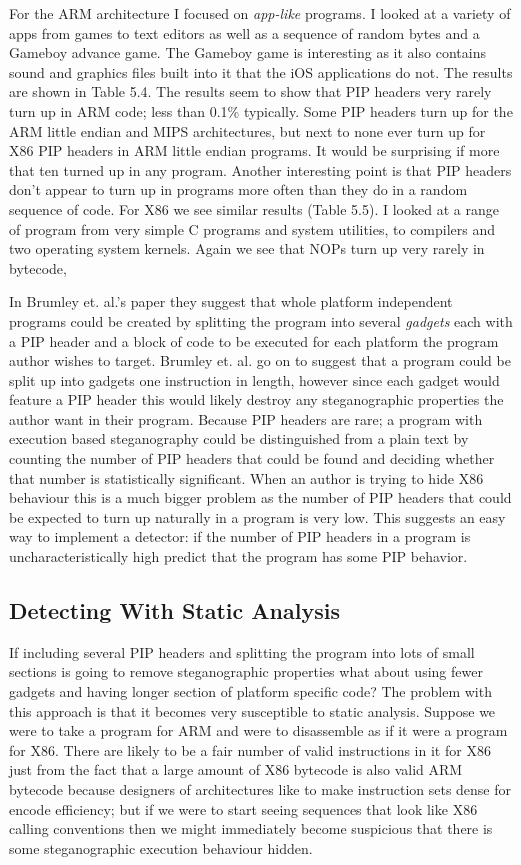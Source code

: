 \documentclass[10pt,]{book}
\begin{document}
For the ARM architecture I focused on \emph{app-like} programs. I looked
at a variety of apps from games to text editors as well as a sequence of
random bytes and a Gameboy advance game. The Gameboy game is interesting
as it also contains sound and graphics files built into it that the iOS
applications do not. The results are shown in Table 5.4. The results
seem to show that PIP headers very rarely turn up in ARM code; less than
0.1\% typically. Some PIP headers turn up for the ARM little endian and
MIPS architectures, but next to none ever turn up for X86 PIP headers in
ARM little endian programs. It would be surprising if more that ten
turned up in any program. Another interesting point is that PIP headers
don't appear to turn up in programs more often than they do in a random
sequence of code. For X86 we see similar results (Table 5.5). I looked
at a range of program from very simple C programs and system utilities,
to compilers and two operating system kernels. Again we see that NOPs
turn up very rarely in bytecode,

In Brumley et. al.'s paper\autocite{Cha:2010uh} they suggest that whole
platform independent programs could be created by splitting the program
into several \emph{gadgets} each with a PIP header and a block of code
to be executed for each platform the program author wishes to target.
Brumley et. al. go on to suggest that a program could be split up into
gadgets one instruction in length, however since each gadget would
feature a PIP header this would likely destroy any steganographic
properties the author want in their program. Because PIP headers are
rare; a program with execution based steganography could be
distinguished from a plain text by counting the number of PIP headers
that could be found and deciding whether that number is statistically
significant. When an author is trying to hide X86 behaviour this is a
much bigger problem as the number of PIP headers that could be expected
to turn up naturally in a program is very low. This suggests an easy way
to implement a detector: if the number of PIP headers in a program is
uncharacteristically high predict that the program has some PIP
behavior.

\subsection{Detecting With Static Analysis}

If including several PIP headers and splitting the program into lots of
small sections is going to remove steganographic properties what about
using fewer gadgets and having longer section of platform specific code?
The problem with this approach is that it becomes very susceptible to
static analysis. Suppose we were to take a program for ARM and were to
disassemble as if it were a program for X86. There are likely to be a
fair number of valid instructions in it for X86 just from the fact that
a large amount of X86 bytecode is also valid ARM bytecode because
designers of architectures like to make instruction sets dense for
encode efficiency; but if we were to start seeing sequences that look
like X86 calling conventions then we might immediately become suspicious
that there is some steganographic execution behaviour hidden.
\end{document}

